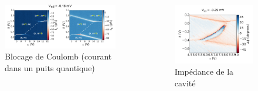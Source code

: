 \documentclass[8pt,a9paper]{beamer} \usepackage[utf8]{inputenc} \usepackage[francais]{babel} \usepackage[T1]{fontenc}
\begin{document}
\begin{frame}
\begin{columns}[T]
\begin{column}{0.65\textwidth}
\begin{figure}[h]
    \begin{center}
        \includegraphics[width=\textwidth]{Images/Exp/CoulombBlockade}
        \caption{Blocage de Coulomb (courant dans un puits quantique)}
    \end{center}
\end{figure}
\end{column}
\begin{column}{0.35\textwidth}
\begin{figure}[h]
    \begin{center}
        \includegraphics[width=\textwidth]{Images/Sweep/20150422_multigrayscale_DeltaEpsilon_001VsdmV_010__grayscale_phase}
        \caption{Impédance de la cavité}
    \end{center}
\end{figure}
\end{column}
\end{columns}

\end{frame}
\end{document}
